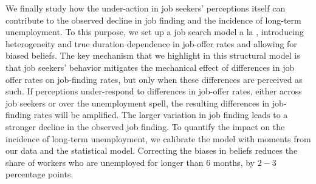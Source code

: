 \documentclass[12pt]{article}
\newcommand{\CiteReference}{../reference.bib}
\theoremstyle{definition}
\begin{document}
We finally study how the under-action in job seekers' perceptions itself can contribute to the observed decline in job finding and the incidence of long-term unemployment. To this purpose, we set up a job search model a la \citet{mccallEconomicsInformationJob1970}, introducing heterogeneity and true duration dependence in job-offer rates and allowing for biased beliefs. The key mechanism that we highlight in this structural model is that job seekers' behavior mitigates the mechanical effect of differences in job offer rates on job-finding rates, but only when these differences are perceived as such. If perceptions under-respond to differences in job-offer rates, either across job seekers or over the unemployment spell, the resulting differences in job-finding rates will be amplified. The larger variation in job finding leads to a stronger decline in the observed job finding. To quantify the impact on the incidence of long-term unemployment, we calibrate the model with moments from our data and the statistical model. Correcting the biases in beliefs reduces the share of workers who are unemployed for longer than $6$ months, by $2-3$ percentage  points.



 
\end{document}
